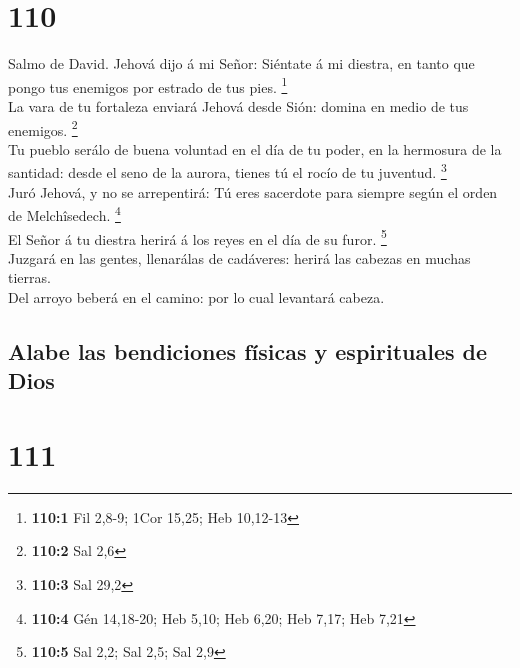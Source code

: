 \hypertarget{section-109}{%
\section{110}\label{section-109}}

 Salmo de David. Jehová dijo á mi Señor: Siéntate á mi
diestra, en tanto que pongo tus enemigos por estrado de tus pies.
\footnote{\textbf{110:1} Fil 2,8-9; 1Cor 15,25; Heb 10,12-13}\\
 La vara de tu fortaleza enviará Jehová desde Sión: domina
en medio de tus enemigos. \footnote{\textbf{110:2} Sal 2,6}\\
 Tu pueblo serálo de buena voluntad en el día de tu poder,
en la hermosura de la santidad: desde el seno de la aurora, tienes tú el
rocío de tu juventud. \footnote{\textbf{110:3} Sal 29,2}\\
 Juró Jehová, y no se arrepentirá: Tú eres sacerdote para
siempre según el orden de Melchîsedech. \footnote{\textbf{110:4} Gén
  14,18-20; Heb 5,10; Heb 6,20; Heb 7,17; Heb 7,21}\\
 El Señor á tu diestra herirá á los reyes en el día de su
furor. \footnote{\textbf{110:5} Sal 2,2; Sal 2,5; Sal 2,9}\\
 Juzgará en las gentes, llenarálas de cadáveres: herirá
las cabezas en muchas tierras.\\
 Del arroyo beberá en el camino: por lo cual levantará
cabeza.

\hypertarget{alabe-las-bendiciones-fuxedsicas-y-espirituales-de-dios}{%
\subsection{Alabe las bendiciones físicas y espirituales de
Dios}\label{alabe-las-bendiciones-fuxedsicas-y-espirituales-de-dios}}

\hypertarget{section-110}{%
\section{111}\label{section-110}}

